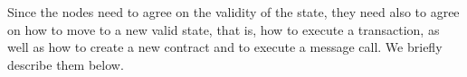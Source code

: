 Since the nodes need to agree on the validity of the state, they need also to
agree on how to move to a new valid state, that is, how to execute a
transaction, as well as how to create a new contract and to execute a message
call. We briefly describe them below.



